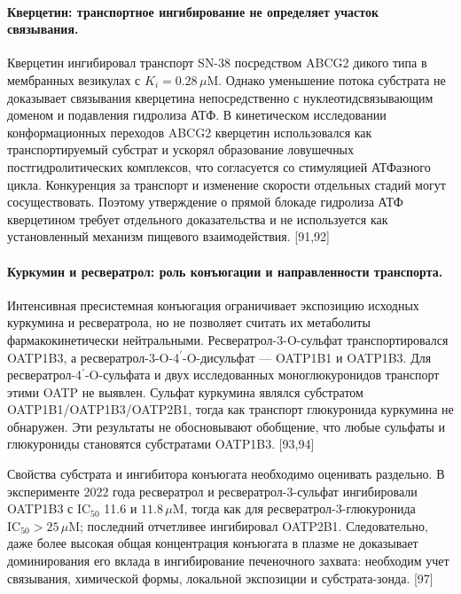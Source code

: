 \documentclass[11pt]{article}
\begin{document}
\paragraph{Кверцетин: транспортное ингибирование не определяет участок связывания.}
Кверцетин ингибировал транспорт SN-38 посредством ABCG2 дикого типа в мембранных везикулах с \(K_i=0.28\,\mu\mathrm{M}\). Однако уменьшение потока субстрата не доказывает связывания кверцетина непосредственно с нуклеотидсвязывающим доменом и подавления гидролиза АТФ. В кинетическом исследовании конформационных переходов ABCG2 кверцетин использовался как транспортируемый субстрат и ускорял образование ловушечных постгидролитических комплексов, что согласуется со стимуляцией АТФазного цикла. Конкуренция за транспорт и изменение скорости отдельных стадий могут сосуществовать. Поэтому утверждение о прямой блокаде гидролиза АТФ кверцетином требует отдельного доказательства и не используется как установленный механизм пищевого взаимодействия. [91,92]

\paragraph{Куркумин и ресвератрол: роль конъюгации и направленности транспорта.}
Интенсивная пресистемная конъюгация ограничивает экспозицию исходных куркумина и ресвератрола, но не позволяет считать их метаболиты фармакокинетически нейтральными. Ресвератрол-3-O-сульфат транспортировался OATP1B3, а ресвератрол-3-O-4\(^{\prime}\)-O-дисульфат --- OATP1B1 и OATP1B3. Для ресвератрол-4\(^{\prime}\)-O-сульфата и двух исследованных моноглюкуронидов транспорт этими OATP не выявлен. Сульфат куркумина являлся субстратом OATP1B1/OATP1B3/OATP2B1, тогда как транспорт глюкуронида куркумина не обнаружен. Эти результаты не обосновывают обобщение, что любые сульфаты и глюкурониды становятся субстратами OATP1B3. [93,94]

Свойства субстрата и ингибитора конъюгата необходимо оценивать раздельно. В эксперименте 2022 года ресвератрол и ресвератрол-3-сульфат ингибировали OATP1B3 с \(\mathrm{IC}_{50}\) 11.6 и \(11.8\,\mu\mathrm{M}\), тогда как для ресвератрол-3-глюкуронида \(\mathrm{IC}_{50}>25\,\mu\mathrm{M}\); последний отчетливее ингибировал OATP2B1. Следовательно, даже более высокая общая концентрация конъюгата в плазме не доказывает доминирования его вклада в ингибирование печеночного захвата: необходим учет связывания, химической формы, локальной экспозиции и субстрата-зонда. [97]
\end{document}
